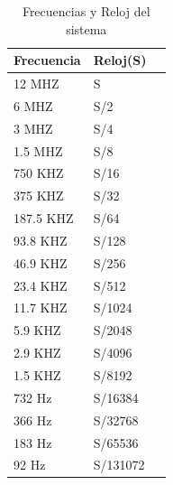 \begin{table}[H]
\centering
\begin{tabular}{lll}
\hline
 \multicolumn{1}{|l|}{Frecuencia} & \multicolumn{1}{l|}{Reloj(S)}                      \\ \hline
 \multicolumn{1}{|l|}{12 MHZ}     & \multicolumn{1}{l|}{S}                             \\ \hline
 \multicolumn{1}{|l|}{6 MHZ}      & \multicolumn{1}{l|}{S/2}                           \\ \hline
 \multicolumn{1}{|l|}{3 MHZ}      & \multicolumn{1}{l|}{S/4}                           \\ \hline
 \multicolumn{1}{|l|}{1.5 MHZ}    & \multicolumn{1}{l|}{S/8}                           \\ \hline
 \multicolumn{1}{|l|}{750 KHZ}    & \multicolumn{1}{l|}{S/16}                          \\ \hline
 \multicolumn{1}{|l|}{375 KHZ}    & \multicolumn{1}{l|}{S/32}                          \\ \hline
 \multicolumn{1}{|l|}{187.5 KHZ}  & \multicolumn{1}{l|}{S/64}                          \\ \hline
 \multicolumn{1}{|l|}{93.8 KHZ}   & \multicolumn{1}{l|}{S/128}                         \\ \hline
 \multicolumn{1}{|l|}{46.9 KHZ}   & \multicolumn{1}{l|}{S/256}                         \\ \hline
 \multicolumn{1}{|l|}{23.4 KHZ}   & \multicolumn{1}{l|}{S/512} \\ \hline
 \multicolumn{1}{|l|}{11.7 KHZ}   & \multicolumn{1}{l|}{S/1024}    \\ \hline
 \multicolumn{1}{|l|}{5.9 KHZ}    & \multicolumn{1}{l|}{S/2048}                        \\ \hline
 \multicolumn{1}{|l|}{2.9 KHZ}    & \multicolumn{1}{l|}{S/4096}                        \\ \hline
 \multicolumn{1}{|l|}{1.5 KHZ}    & \multicolumn{1}{l|}{S/8192}                        \\ \hline
 \multicolumn{1}{|l|}{732 Hz}     & \multicolumn{1}{l|}{S/16384}                       \\ \hline
 \multicolumn{1}{|l|}{366 Hz}     & \multicolumn{1}{l|}{S/32768}                       \\ \hline
 \multicolumn{1}{|l|}{183 Hz}     & \multicolumn{1}{l|}{S/65536}                       \\ \hline
 \multicolumn{1}{|l|}{92 Hz}      & \multicolumn{1}{l|}{S/131072}                      \\ \hline                                                  
\end{tabular}
	\caption{Frecuencias y Reloj del sistema}
	\label{tabla:tabla2}
\end{table}

